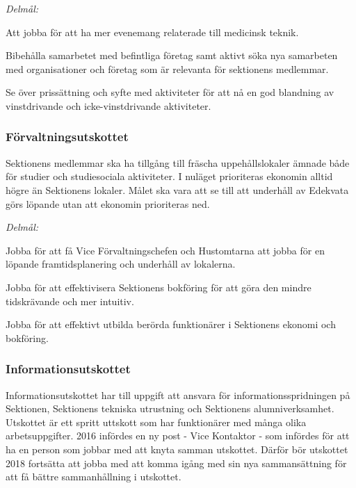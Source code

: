 \documentclass[10pt]{article}
\begin{document}
\emph{Delmål:}
\begin{dashlist}
    \item Att jobba för att ha mer evenemang relaterade till medicinsk teknik.
    \item Bibehålla samarbetet med befintliga företag samt aktivt söka nya samarbeten med organisationer och företag som är relevanta för sektionens medlemmar.
    \item Se över prissättning och syfte med aktiviteter för att nå en god blandning av vinstdrivande och icke-vinstdrivande aktiviteter.
\end{dashlist}

\subsubsection*{Förvaltningsutskottet}
Sektionens medlemmar ska ha tillgång till fräscha uppehållslokaler ämnade både för studier och studiesociala aktiviteter. I nuläget prioriteras ekonomin alltid högre än Sektionens lokaler. Målet ska vara att se till att underhåll av Edekvata görs löpande utan att ekonomin prioriteras ned.

\emph{Delmål:}
\begin{dashlist}
    \item Jobba för att få Vice Förvaltningschefen och Hustomtarna att jobba för en löpande framtidsplanering och underhåll av lokalerna.
    \item Jobba för att effektivisera Sektionens bokföring för att göra den mindre tidskrävande och mer intuitiv.
    \item Jobba för att effektivt utbilda berörda funktionärer i Sektionens ekonomi och bokföring.
\end{dashlist}

\newpage

\subsubsection*{Informationsutskottet}
Informationsutskottet har till uppgift att ansvara för informationsspridningen på Sektionen, Sektionens tekniska utrustning och Sektionens alumniverksamhet. Utskottet är ett spritt uttskott som har funktionärer med många olika arbetsuppgifter. 2016 infördes en ny post - Vice Kontaktor - som infördes för att ha en person som jobbar med att knyta samman utskottet. Därför bör utskottet 2018 fortsätta att jobba med att komma igång med sin nya sammansättning för att få bättre sammanhållning i utskottet.
\end{document}
